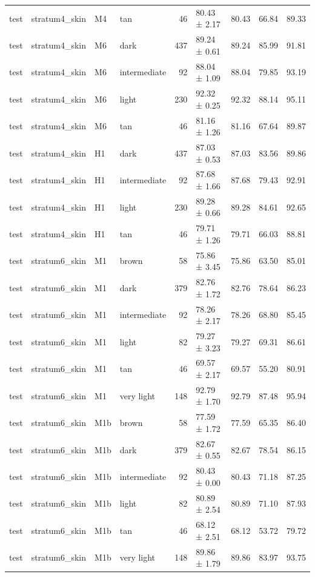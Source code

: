 \begin{tabular}{llllrlrrr}
test & stratum4\_skin & M4 & tan & 46 & 80.43 ± 2.17 & 80.43 & 66.84 & 89.33 \\
test & stratum4\_skin & M6 & dark & 437 & 89.24 ± 0.61 & 89.24 & 85.99 & 91.81 \\
test & stratum4\_skin & M6 & intermediate & 92 & 88.04 ± 1.09 & 88.04 & 79.85 & 93.19 \\
test & stratum4\_skin & M6 & light & 230 & 92.32 ± 0.25 & 92.32 & 88.14 & 95.11 \\
test & stratum4\_skin & M6 & tan & 46 & 81.16 ± 1.26 & 81.16 & 67.64 & 89.87 \\
test & stratum4\_skin & H1 & dark & 437 & 87.03 ± 0.53 & 87.03 & 83.56 & 89.86 \\
test & stratum4\_skin & H1 & intermediate & 92 & 87.68 ± 1.66 & 87.68 & 79.43 & 92.91 \\
test & stratum4\_skin & H1 & light & 230 & 89.28 ± 0.66 & 89.28 & 84.61 & 92.65 \\
test & stratum4\_skin & H1 & tan & 46 & 79.71 ± 1.26 & 79.71 & 66.03 & 88.81 \\
test & stratum6\_skin & M1 & brown & 58 & 75.86 ± 3.45 & 75.86 & 63.50 & 85.01 \\
test & stratum6\_skin & M1 & dark & 379 & 82.76 ± 1.72 & 82.76 & 78.64 & 86.23 \\
test & stratum6\_skin & M1 & intermediate & 92 & 78.26 ± 2.17 & 78.26 & 68.80 & 85.45 \\
test & stratum6\_skin & M1 & light & 82 & 79.27 ± 3.23 & 79.27 & 69.31 & 86.61 \\
test & stratum6\_skin & M1 & tan & 46 & 69.57 ± 2.17 & 69.57 & 55.20 & 80.91 \\
test & stratum6\_skin & M1 & very light & 148 & 92.79 ± 1.70 & 92.79 & 87.48 & 95.94 \\
test & stratum6\_skin & M1b & brown & 58 & 77.59 ± 1.72 & 77.59 & 65.35 & 86.40 \\
test & stratum6\_skin & M1b & dark & 379 & 82.67 ± 0.55 & 82.67 & 78.54 & 86.15 \\
test & stratum6\_skin & M1b & intermediate & 92 & 80.43 ± 0.00 & 80.43 & 71.18 & 87.25 \\
test & stratum6\_skin & M1b & light & 82 & 80.89 ± 2.54 & 80.89 & 71.10 & 87.93 \\
test & stratum6\_skin & M1b & tan & 46 & 68.12 ± 2.51 & 68.12 & 53.72 & 79.72 \\
test & stratum6\_skin & M1b & very light & 148 & 89.86 ± 1.79 & 89.86 & 83.97 & 93.75 \\

\end{tabular}
